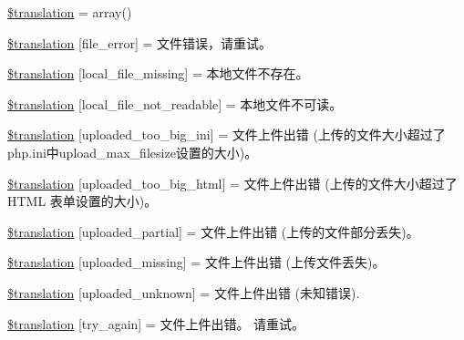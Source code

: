 \begin{DoxyCompactItemize}
\item 
\hyperlink{class_8upload_8zh___c_n_8php_a1f198d410fecc3871ebdd468d343a5e3}{\$translation} = array()
\item 
\hyperlink{class_8upload_8zh___c_n_8php_ac7498e49b9771b04698029aa61c70821}{\$translation} \mbox{[}\textquotesingle{}file\+\_\+error\textquotesingle{}\mbox{]} = \textquotesingle{}文件错误，请重试。\textquotesingle{}
\item 
\hyperlink{class_8upload_8zh___c_n_8php_a6ec3d3a47ab70d77e7aa593e82ead10e}{\$translation} \mbox{[}\textquotesingle{}local\+\_\+file\+\_\+missing\textquotesingle{}\mbox{]} = \textquotesingle{}本地文件不存在。\textquotesingle{}
\item 
\hyperlink{class_8upload_8zh___c_n_8php_a60104befef9b241f3a7a6a755618a4b3}{\$translation} \mbox{[}\textquotesingle{}local\+\_\+file\+\_\+not\+\_\+readable\textquotesingle{}\mbox{]} = \textquotesingle{}本地文件不可读。\textquotesingle{}
\item 
\hyperlink{class_8upload_8zh___c_n_8php_a6a08dcd0d3651fdd098568f6b2f0a42c}{\$translation} \mbox{[}\textquotesingle{}uploaded\+\_\+too\+\_\+big\+\_\+ini\textquotesingle{}\mbox{]} = \textquotesingle{}文件上件出错 (上传的文件大小超过了php.\+ini中upload\+\_\+max\+\_\+filesize设置的大小)。\textquotesingle{}
\item 
\hyperlink{class_8upload_8zh___c_n_8php_a623d5b8b92169f57d7e43458aa911cbb}{\$translation} \mbox{[}\textquotesingle{}uploaded\+\_\+too\+\_\+big\+\_\+html\textquotesingle{}\mbox{]} = \textquotesingle{}文件上件出错 (上传的文件大小超过了\+H\+T\+M\+L 表单设置的大小)。\textquotesingle{}
\item 
\hyperlink{class_8upload_8zh___c_n_8php_a967c17da21b0a2d3bd65cca3a9ca0ea8}{\$translation} \mbox{[}\textquotesingle{}uploaded\+\_\+partial\textquotesingle{}\mbox{]} = \textquotesingle{}文件上件出错 (上传的文件部分丢失)。\textquotesingle{}
\item 
\hyperlink{class_8upload_8zh___c_n_8php_a0cce433260be65f1f35853a6b4b8952b}{\$translation} \mbox{[}\textquotesingle{}uploaded\+\_\+missing\textquotesingle{}\mbox{]} = \textquotesingle{}文件上件出错 (上传文件丢失)。\textquotesingle{}
\item 
\hyperlink{class_8upload_8zh___c_n_8php_a4a9168e922b827e6a28b5db1c00774ca}{\$translation} \mbox{[}\textquotesingle{}uploaded\+\_\+unknown\textquotesingle{}\mbox{]} = \textquotesingle{}文件上件出错 (未知错误).\textquotesingle{}
\item 
\hyperlink{class_8upload_8zh___c_n_8php_a3afc377bd803683314f413a814243066}{\$translation} \mbox{[}\textquotesingle{}try\+\_\+again\textquotesingle{}\mbox{]} = \textquotesingle{}文件上件出错。 请重试。\textquotesingle{}

\end{DoxyCompactItemize}
